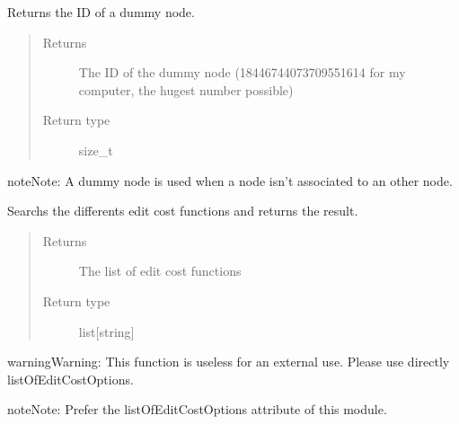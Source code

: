 \documentclass[letterpaper,10pt,english]{sphinxmanual}
\begin{document}
\begin{fulllineitems}
\label{doc:PythonGedLib.PyGetDummyNode}
Returns the ID of a dummy node.
\begin{quote}\begin{description}
\item[{Returns}] \leavevmode
The ID of the dummy node (18446744073709551614 for my computer, the hugest number possible)

\item[{Return type}] \leavevmode
size\_t

\end{description}\end{quote}

\begin{notice}{note}{Note:}
A dummy node is used when a node isn't associated to an other node.
\end{notice}

\end{fulllineitems}


\begin{fulllineitems}
\label{doc:PythonGedLib.PyGetEditCostOptions}
Searchs the differents edit cost functions and returns the result.
\begin{quote}\begin{description}
\item[{Returns}] \leavevmode
The list of edit cost functions

\item[{Return type}] \leavevmode
list{[}string{]}

\end{description}\end{quote}

\begin{notice}{warning}{Warning:}
This function is useless for an external use. Please use directly listOfEditCostOptions.
\end{notice}

\begin{notice}{note}{Note:}
Prefer the listOfEditCostOptions attribute of this module.
\end{notice}

\end{fulllineitems}
\end{document}
